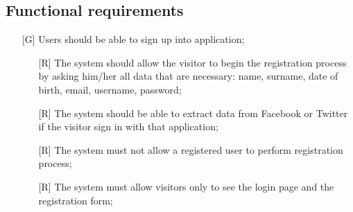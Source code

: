 \documentclass[12pt,titlepage]{article}
\begin{document}
\subsection{Functional requirements}\label{sec:mod1}
\begin{itemize}
\item [{[G\ped{1}]}]	Users should be able to sign up into application;
\begin{itemize}
\item[{[R\ped{1}]}] The system should allow the visitor to begin the registration process by asking him/her all data that are necessary: name, surname, date of birth, email, username, password;
\item[{[R\ped{2}]}] The system should be able to extract data from Facebook or Twitter if the visitor sign in with that application;
\item[{[R\ped{3}]}] The system must not allow a registered user to perform registration process;
\item[{[R\ped{4}]}] The system must allow visitors only to see the login page and the registration form;


\end{itemize}
\end{itemize}
\end{document}
